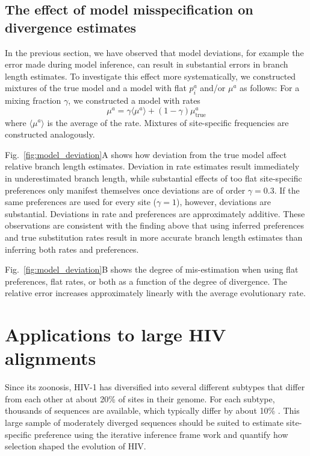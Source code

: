 \documentclass[aps,rmp,twocolumn,linenumbers]{revtex4-1}
\newcommand{\eqp}{p}
\begin{document}
\subsection*{The effect of model misspecification on divergence estimates}
In the previous section, we have observed that model deviations, for example the error made during model inference, can result in substantial errors in branch length estimates.
To investigate this effect more systematically, we constructed mixtures of the true model and a model with flat $\eqp_i^a$ and/or $\mu^a$ as follows:
For a mixing fraction $\gamma$, we constructed a model with rates
\begin{equation}
\label{eq:mixture_model}
	\mu^a = \gamma \langle \mu^a\rangle + (1-\gamma) \mu^a_{\mathrm{true}}
\end{equation}
where $\langle \mu^a\rangle$ is the average of the rate.
Mixtures of site-specific frequencies are constructed analogously.

Fig.~\ref{fig:model_deviation}A shows how deviation from the true model affect relative branch length estimates.
Deviation in rate estimates result immediately in underestimated branch length, while substantial effects of too flat site-specific preferences only manifest themselves once deviations are of order $\gamma = 0.3$.
If the same preferences are used for every site ($\gamma=1$), however, deviations are substantial.
Deviations in rate and preferences are approximately additive.
These observations are consistent with the finding above that using inferred preferences and true substitution rates result in more accurate branch length estimates than inferring both rates and preferences.

Fig.~\ref{fig:model_deviation}B shows the degree of mis-estimation when using flat preferences, flat rates, or both as a function of the degree of divergence.
The relative error increases approximately linearly with the average evolutionary rate.


\section*{Applications to large HIV alignments}
Since its zoonosis, HIV-1 has diversified into several different subtypes that differ from each other at about 20\% of sites in their genome.
For each subtype, thousands of sequences are available, which typically differ by about 10\% \citep{LANL}.
This large sample of moderately diverged sequences should be suited to estimate site-specific preference using the iterative inference frame work and quantify how selection shaped the evolution of HIV.
\end{document}
